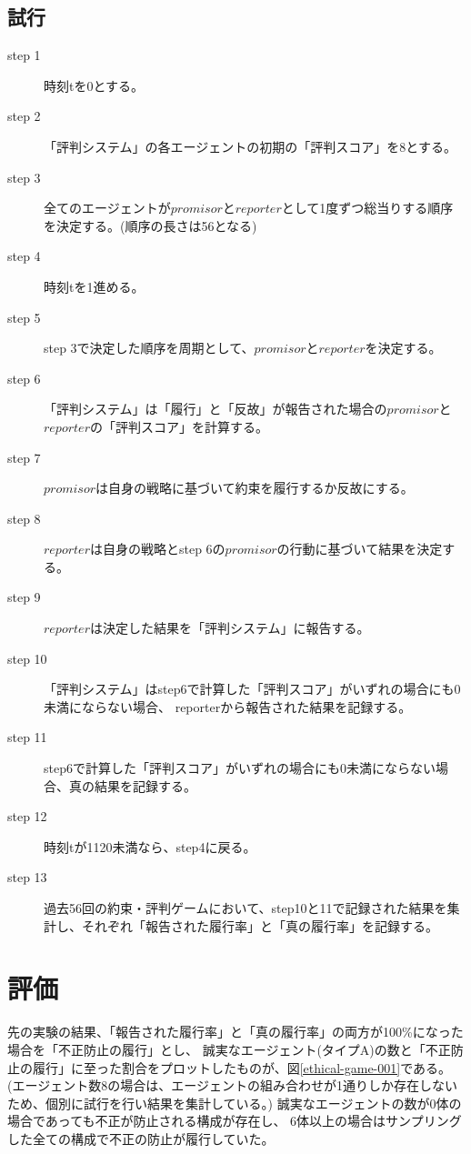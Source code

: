 \subsection{試行}
\begin{description}
  \item[step 1] 時刻tを0とする。
  \item[step 2] 「評判システム」の各エージェントの初期の「評判スコア」を8とする。
  \item[step 3] 全てのエージェントが$promisor$と$reporter$として1度ずつ総当りする順序を決定する。(順序の長さは56となる)
  \item[step 4] 時刻tを1進める。
  \item[step 5] step 3で決定した順序を周期として、$promisor$と$reporter$を決定する。
  \item[step 6] 「評判システム」は「履行」と「反故」が報告された場合の$promisor$と$reporter$の「評判スコア」を計算する。
  \item[step 7] $promisor$は自身の戦略に基づいて約束を履行するか反故にする。
  \item[step 8] $reporter$は自身の戦略とstep 6の$promisor$の行動に基づいて結果を決定する。
  \item[step 9] $reporter$は決定した結果を「評判システム」に報告する。 
  \item[step 10] 「評判システム」はstep6で計算した「評判スコア」がいずれの場合にも0未満にならない場合、 reporterから報告された結果を記録する。
  \item[step 11] step6で計算した「評判スコア」がいずれの場合にも0未満にならない場合、真の結果を記録する。
  \item[step 12] 時刻tが1120未満なら、step4に戻る。
  \item[step 13] 過去56回の約束・評判ゲームにおいて、step10と11で記録された結果を集計し、それぞれ「報告された履行率」と「真の履行率」を記録する。
\end{description}

\section{評価}
先の実験の結果、「報告された履行率」と「真の履行率」の両方が100\%になった場合を「不正防止の履行」とし、
誠実なエージェント(タイプA)の数と「不正防止の履行」に至った割合をプロットしたものが、図\ref{ethical-game-001}である。
(エージェント数8の場合は、エージェントの組み合わせが1通りしか存在しないため、個別に試行を行い結果を集計している。)
誠実なエージェントの数が0体の場合であっても不正が防止される構成が存在し、
6体以上の場合はサンプリングした全ての構成で不正の防止が履行していた。

